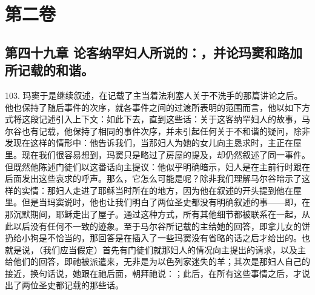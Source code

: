 \section{ 第二卷}


\subsection{第四十九章 论客纳罕妇人所说的：，并论玛窦和路加所记载的和谐。}

103. 玛窦于是继续叙述，在记载了主当着法利塞人关于不洗手的那篇讲论之后。他也保持了随后事件的次序，就各事件之间的过渡所表明的范围而言，他以如下方式将这段记述引入上下文：如此下去，直到这些话：关于这客纳罕妇人的故事，马尔谷也有记载，他保持了相同的事件次序，并未引起任何关于不和谐的疑问，除非发现在这样的情形中：他告诉我们，当那妇人为她的女儿向主恳求时，主正在屋里。现在我们很容易想到，玛窦只是略过了房屋的提及，却仍然叙述了同一事件。但既然他陈述门徒们以这番话向主提议：他似乎明确暗示，妇人是在主前行时跟在后面发出这些哀求的呼声。那么，它怎么可能是呢？除非我们理解马尔谷暗示了这样的实情：那妇人走进了耶稣当时所在的地方，因为他在叙述的开头提到他在屋里。但是当玛窦说时，他也让我们明白了两位圣史都没有明确叙述的事——即，在那沉默期间，耶稣走出了屋子。通过这种方式，所有其他细节都被联系在一起，从此以后没有任何不一致的迹象。至于马尔谷所记载的主给她的回答，即拿儿女的饼扔给小狗是不恰当的，那回答是在插入了一些玛窦没有省略的话之后才给出的。也就是说，（我们应当假定）首先有门徒们就那妇人的情况向主提出的请求，以及主给他们的回答，即祂被派遣来，无非是为以色列家迷失的羊；其次是那妇人自己的接近，换句话说，她跟在祂后面，朝拜祂说：；此后，在所有这些事情之后，才说出了两位圣史都记载的那些话。\par



